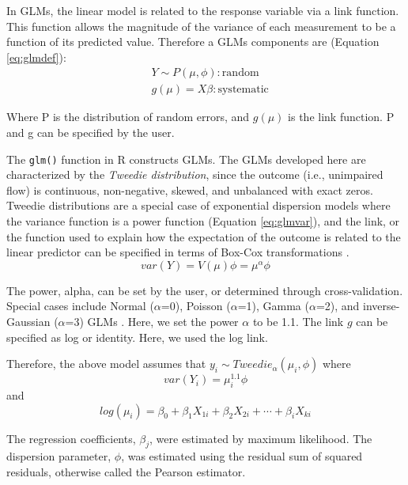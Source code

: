 In GLMs, the linear model is related to the response variable via a link function. This function allows the magnitude of the variance of each measurement to be a function of its predicted value. Therefore a GLMs components are (Equation \ref{eq:glmdef}): 
\begin{equation} \label{eq:glmdef}
	\begin{aligned}
		& Y \sim P(\mu, \phi)  \mathrm{: random}\\
		& g(\mu)=X\beta \mathrm{: systematic}
	\end{aligned}
\end{equation} 

Where P is the distribution of random errors, and $g(\mu)$ is the link function. P and g can be specified by the user.

The {\tt glm()} function in R constructs GLMs. The GLMs developed here are characterized by the \textit{Tweedie distribution}, since the outcome (i.e., unimpaired flow) is continuous, non-negative, skewed, and unbalanced with exact zeros. Tweedie distributions are a special case of exponential dispersion models where the variance function is a power function (Equation \ref{eq:glmvar}), and the link, or the function used to explain how the expectation of the outcome is related to the linear predictor can be specified in terms of Box-Cox transformations \cite{jorgensen1997theory}.
\begin{equation} \label{eq:glmvar}
	var(Y)=V(\mu)\phi=\mu^\alpha \phi
\end{equation}

The power, alpha, can be set by the user, or determined through cross-validation. Special cases include Normal ($\alpha$=0), Poisson ($\alpha$=1), Gamma ($\alpha$=2), and inverse-Gaussian ($\alpha$=3) GLMs . Here, we set the power $\alpha$ to be 1.1. The link $g$ can be specified as log or identity. Here, we used the log link. 

Therefore, the above model assumes that $y_i \sim Tweedie_{\alpha}(\mu_i, \phi)$ where
\begin{equation*}
	var(Y_i)=\mu_i^{1.1} \phi
\end{equation*}
and 
\begin{equation*}
	log(\mu_i)=\beta_{0} +\beta_{1} X_{1i} +\beta_{2} X_{2i} +\cdots +\beta_{i} X_{ki}
\end{equation*}

The regression coefficients, $\beta_{j}$, were estimated by maximum likelihood. The dispersion parameter, $\phi$, was estimated using the residual sum of squared residuals, otherwise called the Pearson estimator.

